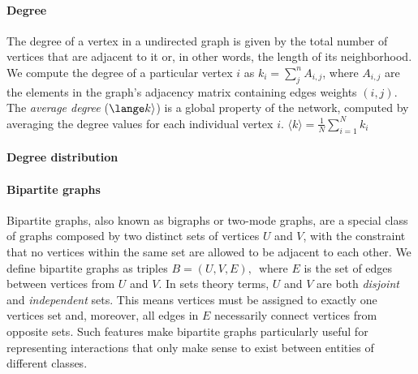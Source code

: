 \paragraph*{Degree}
The degree of a vertex in a undirected graph is given by the total number of vertices that are adjacent to it or, in other words, the length of its neighborhood.
We compute the degree of a particular vertex $i$ as 
$
k_i = \sum_j^{n} A_{i,j}
$,
where $A_{i,j}$ are the elements in the graph's adjacency matrix containing edges weights $(i,j)$.
The \textit{average degree} ($\lange k \rangle$) is a global property of the network, computed by averaging the degree values for each individual vertex $i$.
$
\langle k \rangle = \frac{1}{N} \sum_{i=1}^N k_i
$

\paragraph*{Degree distribution}



\paragraph*{Bipartite graphs}
Bipartite graphs, also known as bigraphs or two-mode graphs, are a special class of graphs composed by two distinct sets of vertices $U$ and $V$, with the constraint that no vertices within the same set are allowed to be adjacent to each other. 
We define bipartite graphs as triples 
$
B = (U, V, E) \mbox{, }
$
where $E$ is the set of edges between vertices from $U$ and $V$.
In sets theory terms, $U$ and $V$ are both \textit{disjoint} and \textit{independent} sets.
This means vertices must be assigned to exactly one vertices set and, moreover, all edges in $E$ necessarily connect vertices from opposite sets. 
Such features make bipartite graphs particularly useful for representing interactions that only make sense to exist between entities of different classes. 

